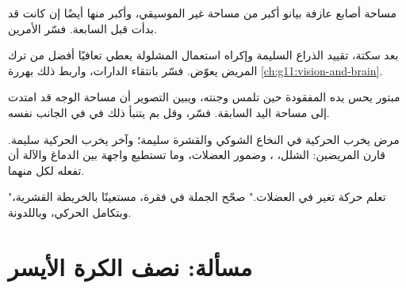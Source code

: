 \begin{exercise}[$\star\star$]\label{exo:g12:brain-and-movement:11}
مساحة أصابع عازفة بيانو أكبر من مساحة غير الموسيقي، وأكبر منها أيضًا
إن كانت قد بدأت قبل السابعة. فسّر الأمرين.
\end{exercise}

\begin{exercise}[$\star\star\star$]\label{exo:g12:brain-and-movement:12}
بعد سكتة، تقييد الذراع السليمة وإكراه استعمال المشلولة يعطي تعافيًا
أفضل من ترك المريض يعوّض. فسّر بانتقاء الدارات، واربط ذلك بهررة
\cref{ch:g11:vision-and-brain}.
\end{exercise}

\begin{exercise}[$\star\star\star$]\label{exo:g12:brain-and-movement:13}
مبتور يحس يده المفقودة حين تلمس وجنته، ويبين التصوير أن مساحة الوجه قد
امتدت إلى مساحة اليد السابقة. فسّر، وقل بم يتنبأ ذلك في 
في الجانب نفسه.
\end{exercise}

\begin{exercise}[$\star\star\star$]\label{exo:g12:brain-and-movement:14}
مرض يخرب  الحركية في النخاع الشوكي والقشرة سليمة؛ وآخر يخرب
  الحركية سليمة. قارن المريضين: الشلل،
، وضمور العضلات، وما تستطيع واجهة بين الدماغ والآلة أن تفعله
لكل منهما.
\end{exercise}

\begin{exercise}[$\star\star\star$]\label{exo:g12:brain-and-movement:15}
"تعلم حركة تغير في العضلات." صحّح الجملة في فقرة، مستعينًا بالخريطة
القشرية، وبتكامل  الحركي، وباللدونة.
\end{exercise}

\section{مسألة: نصف الكرة الأيسر}


